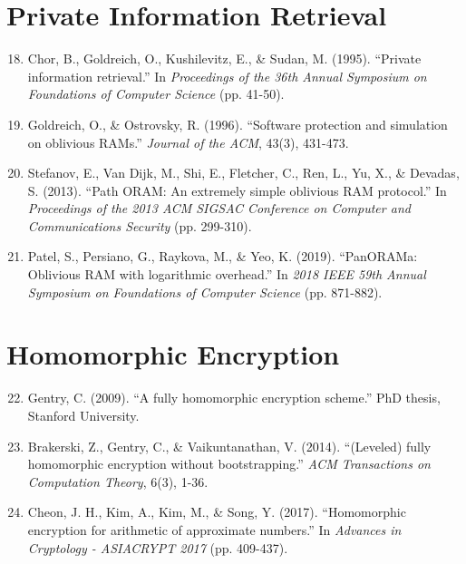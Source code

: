 \section*{Private Information Retrieval}

\begin{enumerate}
\setcounter{enumi}{17}
\item Chor, B., Goldreich, O., Kushilevitz, E., \& Sudan, M. (1995). ``Private information retrieval.'' In \textit{Proceedings of the 36th Annual Symposium on Foundations of Computer Science} (pp. 41-50).

\item Goldreich, O., \& Ostrovsky, R. (1996). ``Software protection and simulation on oblivious RAMs.'' \textit{Journal of the ACM}, 43(3), 431-473.

\item Stefanov, E., Van Dijk, M., Shi, E., Fletcher, C., Ren, L., Yu, X., \& Devadas, S. (2013). ``Path ORAM: An extremely simple oblivious RAM protocol.'' In \textit{Proceedings of the 2013 ACM SIGSAC Conference on Computer and Communications Security} (pp. 299-310).

\item Patel, S., Persiano, G., Raykova, M., \& Yeo, K. (2019). ``PanORAMa: Oblivious RAM with logarithmic overhead.'' In \textit{2018 IEEE 59th Annual Symposium on Foundations of Computer Science} (pp. 871-882).
\end{enumerate}

\section*{Homomorphic Encryption}

\begin{enumerate}
\setcounter{enumi}{21}
\item Gentry, C. (2009). ``A fully homomorphic encryption scheme.'' PhD thesis, Stanford University.

\item Brakerski, Z., Gentry, C., \& Vaikuntanathan, V. (2014). ``(Leveled) fully homomorphic encryption without bootstrapping.'' \textit{ACM Transactions on Computation Theory}, 6(3), 1-36.

\item Cheon, J. H., Kim, A., Kim, M., \& Song, Y. (2017). ``Homomorphic encryption for arithmetic of approximate numbers.'' In \textit{Advances in Cryptology - ASIACRYPT 2017} (pp. 409-437).
\end{enumerate}

